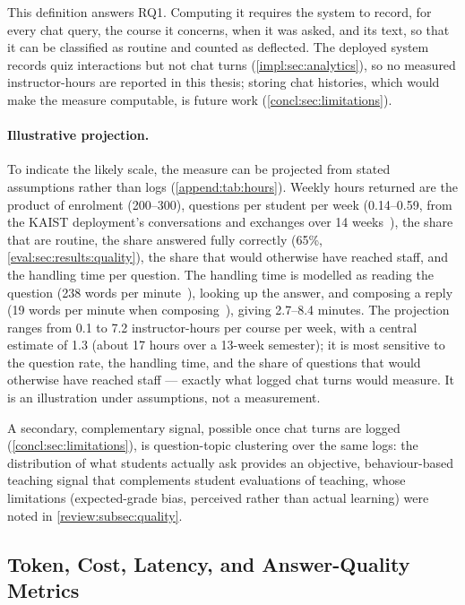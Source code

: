 This definition answers RQ1. Computing it requires the system to record,
for every chat query, the course it concerns, when it was asked, and its
text, so that it can be classified as routine and counted as deflected.
The deployed system records quiz interactions but not chat turns
(\autoref{impl:sec:analytics}), so no measured instructor-hours are reported
in this thesis; storing chat histories, which would make the measure
computable, is future work (\autoref{concl:sec:limitations}).

\paragraph{Illustrative projection.} To indicate the likely scale, the measure
can be projected from stated assumptions rather than logs
(\autoref{append:tab:hours}). Weekly hours returned are the product of
enrolment (200--300), questions per student per week (0.14--0.59, from the
KAIST deployment's conversations and exchanges over 14
weeks~\cite{acl25:Kweon}), the share that are routine, the share answered
fully correctly (65\%, \autoref{eval:sec:results:quality}), the share that
would otherwise have reached staff, and the handling time per question. The
handling time is modelled as reading the question (238 words per
minute~\cite{jml19:Brysbaert}), looking up the answer, and composing a reply
(19 words per minute when composing~\cite{chi99:Karat}), giving 2.7--8.4
minutes. The projection ranges from 0.1 to 7.2 instructor-hours per course per
week, with a central estimate of 1.3 (about 17 hours over a 13-week
semester); it is most sensitive to the question rate, the handling time, and
the share of questions that would otherwise have reached staff --- exactly
what logged chat turns would measure. It is an illustration under
assumptions, not a measurement.

A secondary, complementary signal, possible once chat turns are logged
(\autoref{concl:sec:limitations}), is question-topic clustering over the same
logs: the distribution of what students actually ask provides an objective,
behaviour-based teaching signal that complements student evaluations of
teaching, whose limitations (expected-grade bias, perceived rather than
actual learning) were noted in \autoref{review:subsec:quality}.

\subsection{Token, Cost, Latency, and Answer-Quality Metrics}
\label{eval:subsec:tokenmetrics}

